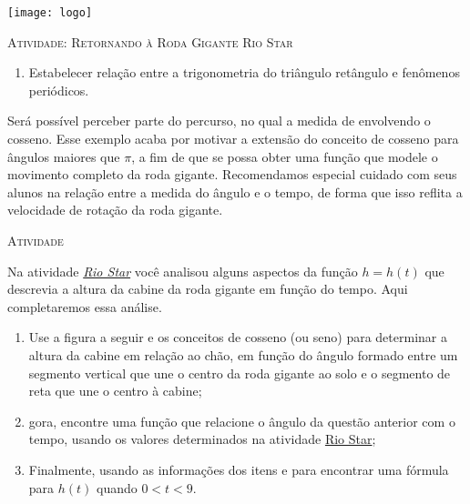 \documentclass[10 pt,usenames,dvipsnames, oneside]{article}
\begin{document}
\begin{center}
  \begin{minipage}[l]{3cm}
\texttt{[image: logo]}    
\end{minipage}\hfill
\begin{minipage}[r]{.8\textwidth}
 {\Large \scshape Atividade: Retornando à Roda Gigante Rio Star}  
\end{minipage}
\end{center}
\vspace{.2cm}

\ifdefined\prof

\begin{goals}
\begin{enumerate}
\item Estabelecer relação entre a trigonometria do triângulo retângulo e fenômenos periódicos.
\end{enumerate}

\tcblower

Será possível perceber parte do percurso, no qual a medida de envolvendo o cosseno. Esse exemplo acaba por motivar a extensão do conceito de cosseno para ângulos maiores que $\pi$, a fim de que se possa obter uma função que modele o movimento completo da roda gigante. Recomendamos especial cuidado com seus alunos na relação entre a medida do ângulo e o tempo, de forma que isso reflita a velocidade de rotação da roda gigante.
\end{goals}

\bigskip
\begin{center}
{\large \scshape Atividade}
\end{center}
\fi

Na atividade \hyperref[trig-ativ4]{\textit{Rio Star}}  você analisou alguns aspectos da função $h = h(t)$ que descrevia a altura da cabine da roda gigante em função do tempo. Aqui completaremos essa análise.
\begin{enumerate}
\item Use a figura a seguir e os conceitos de cosseno (ou seno) para determinar a altura da cabine em relação ao chão, em função do ângulo formado entre um segmento vertical que une o centro da roda gigante ao solo e o segmento de reta que une o centro à cabine;
\item gora, encontre uma função que relacione o ângulo da questão anterior com o tempo, usando os valores determinados na atividade \hyperref[trig-ativ4]{Rio Star};
\item Finalmente, usando as informações dos itens  e  para encontrar uma fórmula para $h(t)$ quando $0 < t < 9$.
\end{enumerate}
\end{document}

